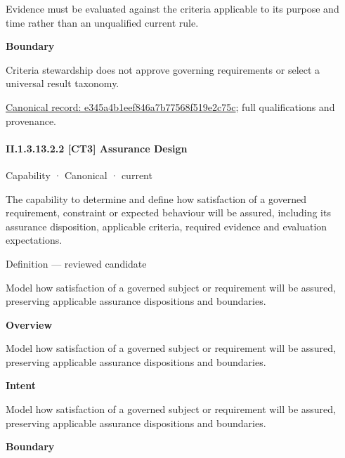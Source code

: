 Evidence must be evaluated against the criteria applicable to its purpose and time rather than an unqualified current rule.



\textbf{Boundary}



Criteria stewardship does not approve governing requirements or select a universal result taxonomy.


{\footnotesize \href{../../../../continuum/strategy/capability/feature/e345a4b1eef846a7b77568f519e2c75c.md}{Canonical record: e345a4b1eef846a7b77568f519e2c75c}; full qualifications and provenance.}\par
\paragraph*{II.1.3.13.2.2 [CT3] Assurance Design}
\label{navigation:II.1.3.13.2.2}

\label{element:71c8a612b88f4ecba049e94d506bd0c2}
{\small Capability · Canonical · current}\par

The capability to determine and define how satisfaction of a governed requirement, constraint or expected behaviour will be assured, including its assurance disposition, applicable criteria, required evidence and evaluation expectations.



Definition — reviewed candidate



Model how satisfaction of a governed subject or requirement will be assured, preserving applicable assurance dispositions and boundaries.



\textbf{Overview}



Model how satisfaction of a governed subject or requirement will be assured, preserving applicable assurance dispositions and boundaries.



\textbf{Intent}



Model how satisfaction of a governed subject or requirement will be assured, preserving applicable assurance dispositions and boundaries.



\textbf{Boundary}



